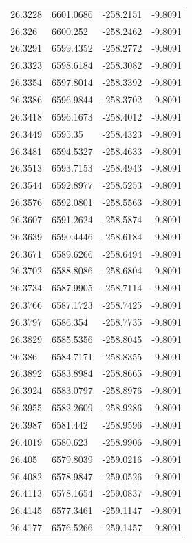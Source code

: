 \begin{table}[H]
\begin{tabular}{llll}
26.3228 & 6601.0686 & -258.2151 & -9.8091 \\
26.326 & 6600.252 & -258.2462 & -9.8091 \\
26.3291 & 6599.4352 & -258.2772 & -9.8091 \\
26.3323 & 6598.6184 & -258.3082 & -9.8091 \\
26.3354 & 6597.8014 & -258.3392 & -9.8091 \\
26.3386 & 6596.9844 & -258.3702 & -9.8091 \\
26.3418 & 6596.1673 & -258.4012 & -9.8091 \\
26.3449 & 6595.35 & -258.4323 & -9.8091 \\
26.3481 & 6594.5327 & -258.4633 & -9.8091 \\
26.3513 & 6593.7153 & -258.4943 & -9.8091 \\
26.3544 & 6592.8977 & -258.5253 & -9.8091 \\
26.3576 & 6592.0801 & -258.5563 & -9.8091 \\
26.3607 & 6591.2624 & -258.5874 & -9.8091 \\
26.3639 & 6590.4446 & -258.6184 & -9.8091 \\
26.3671 & 6589.6266 & -258.6494 & -9.8091 \\
26.3702 & 6588.8086 & -258.6804 & -9.8091 \\
26.3734 & 6587.9905 & -258.7114 & -9.8091 \\
26.3766 & 6587.1723 & -258.7425 & -9.8091 \\
26.3797 & 6586.354 & -258.7735 & -9.8091 \\
26.3829 & 6585.5356 & -258.8045 & -9.8091 \\
26.386 & 6584.7171 & -258.8355 & -9.8091 \\
26.3892 & 6583.8984 & -258.8665 & -9.8091 \\
26.3924 & 6583.0797 & -258.8976 & -9.8091 \\
26.3955 & 6582.2609 & -258.9286 & -9.8091 \\
26.3987 & 6581.442 & -258.9596 & -9.8091 \\
26.4019 & 6580.623 & -258.9906 & -9.8091 \\
26.405 & 6579.8039 & -259.0216 & -9.8091 \\
26.4082 & 6578.9847 & -259.0526 & -9.8091 \\
26.4113 & 6578.1654 & -259.0837 & -9.8091 \\
26.4145 & 6577.3461 & -259.1147 & -9.8091 \\
26.4177 & 6576.5266 & -259.1457 & -9.8091 \\

\end{tabular}
\end{table}
